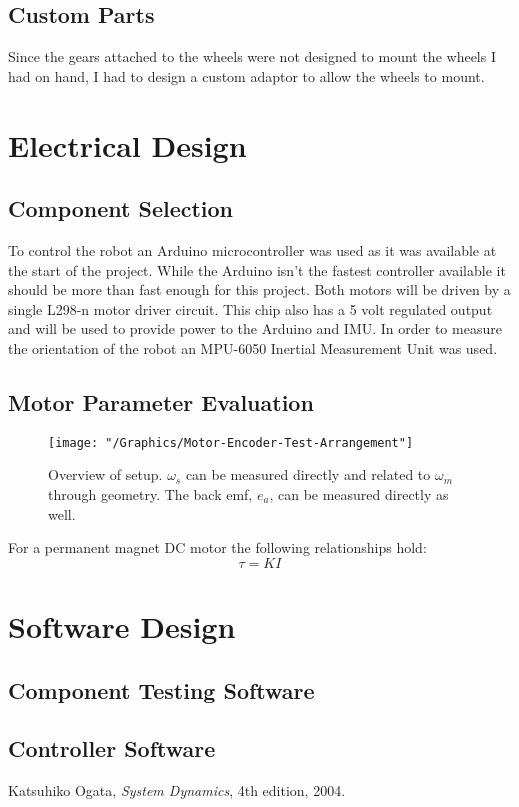 \documentclass{article}
\begin{document}
		
	\subsection{Custom Parts}
	Since the gears attached to the wheels were not designed to mount the wheels I had on hand, I had to design a custom adaptor to allow the wheels to mount. 

\section{Electrical Design}
	\subsection{Component Selection}
	To control the robot an Arduino microcontroller was used as it was available at the start of the project. While the Arduino isn't the fastest controller available it should be more than fast enough for this project.
	Both motors will be driven by a single L298-n motor driver circuit. This chip also has a 5 volt regulated output and will be used to provide power to the Arduino and IMU. 
	In order to measure the orientation of the robot an MPU-6050 Inertial Measurement Unit was used.
	
	
	\subsection{Motor Parameter Evaluation}
	\begin{figure}[h]
		\centerline{\texttt{[image: "/Graphics/Motor-Encoder-Test-Arrangement"]}}
		\caption{Overview of setup. $\omega_s$ can be measured directly and related to $\omega_m$ through geometry. The back emf, $e_a$, can be measured directly as well.}
		\label{fig:DirectFeedRL}
	\end{figure}
	
	For a permanent magnet DC motor the following relationships hold\cite{Ogata}:
	$$\tau = KI$$
	$$$$
	

\section{Software Design}
	\subsection{Component Testing Software}
	
	\subsection{Controller Software}
	
\begin{thebibliography}{9}	%

		Katsuhiko Ogata,
		\textit{System Dynamics},
		4th edition,
		2004.

\end{thebibliography}
\end{document}
